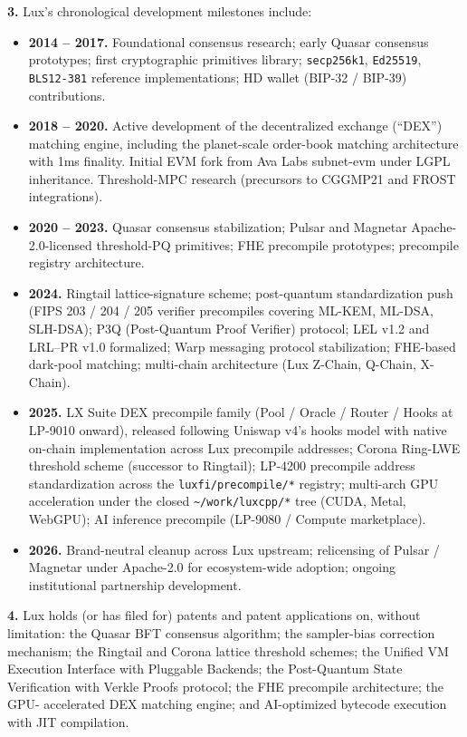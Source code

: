 \documentclass[11pt,letterpaper]{article}
\begin{document}
\textbf{3.} Lux's chronological development milestones include:

\begin{itemize}[leftmargin=2em,itemsep=0.1em]
\item \textbf{2014 -- 2017.} Foundational consensus research; early
Quasar consensus prototypes; first cryptographic primitives library;
\texttt{secp256k1}, \texttt{Ed25519}, \texttt{BLS12-381} reference
implementations; HD wallet (BIP-32 / BIP-39) contributions.
\item \textbf{2018 -- 2020.} Active development of the decentralized
exchange (``DEX'') matching engine, including the planet-scale
order-book matching architecture with 1ms finality. Initial EVM fork
from Ava Labs subnet-evm under LGPL inheritance. Threshold-MPC
research (precursors to CGGMP21 and FROST integrations).
\item \textbf{2020 -- 2023.} Quasar consensus stabilization; Pulsar
and Magnetar Apache-2.0-licensed threshold-PQ primitives; FHE
precompile prototypes; precompile registry architecture.
\item \textbf{2024.} Ringtail lattice-signature scheme; post-quantum
standardization push (FIPS 203 / 204 / 205 verifier precompiles
covering ML-KEM, ML-DSA, SLH-DSA); P3Q (Post-Quantum Proof Verifier)
protocol; LEL v1.2 and LRL--PR v1.0 formalized; Warp messaging
protocol stabilization; FHE-based dark-pool matching; multi-chain
architecture (Lux Z-Chain, Q-Chain, X-Chain).
\item \textbf{2025.} LX Suite DEX precompile family (Pool / Oracle /
Router / Hooks at LP-9010 onward), released following Uniswap v4's
hooks model with native on-chain implementation across Lux precompile
addresses; Corona Ring-LWE threshold scheme (successor to Ringtail);
LP-4200 precompile address standardization across the
\texttt{luxfi/precompile/*} registry; multi-arch GPU acceleration under
the closed \texttt{\textasciitilde/work/luxcpp/*} tree (CUDA, Metal,
WebGPU); AI inference precompile (LP-9080 / Compute marketplace).
\item \textbf{2026.} Brand-neutral cleanup across Lux upstream;
relicensing of Pulsar / Magnetar under Apache-2.0 for ecosystem-wide
adoption; ongoing institutional partnership development.
\end{itemize}

\textbf{4.} Lux holds (or has filed for) patents and patent
applications on, without limitation: the Quasar BFT consensus
algorithm; the sampler-bias correction mechanism; the Ringtail and
Corona lattice threshold schemes; the Unified VM Execution Interface
with Pluggable Backends; the Post-Quantum State Verification with
Verkle Proofs protocol; the FHE precompile architecture; the GPU-
accelerated DEX matching engine; and AI-optimized bytecode execution
with JIT compilation.
\end{document}
